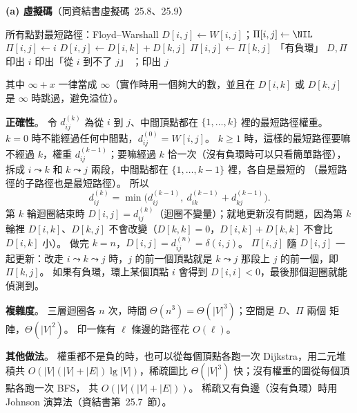 \begin{pastsoln}
\textbf{(a) 虛擬碼}（同資結書虛擬碼~25.8、25.9）
\begin{pseudo}{所有點對最短路徑：Floyd--Warshall}
            \State $D[i, j] \gets W[i, j]$；$\Pi[i, j] \gets \NIL$
                \State $\Pi[i, j] \gets i$
            \EndIf
        \EndFor
    \EndFor
     
                    \State $D[i, j] \gets D[i, k] + D[k, j]$
                    \State $\Pi[i, j] \gets \Pi[k, j]$
                \EndIf
            \EndFor
        \EndFor
    \EndFor
            \State \Return 「有負環」
        \EndIf
    \EndFor
    \State \Return $D, \Pi$
\EndFunction
\Statex
{}
        \State 印出 $i$
    \ElsIf{$\Pi[i, j] = \NIL$}
        \State 印出「從 $i$ 到不了 $j$」
    \Else
        \State {}；印出 $j$
    \EndIf
\EndProcedure
\end{pseudo}
其中 $\infty + x$ 一律當成 $\infty$（實作時用一個夠大的數，並且在 $D[i, k]$ 或 $D[k, j]$ 是
$\infty$ 時跳過，避免溢位）。

\textbf{正確性}。 令 $d_{ij}^{(k)}$ 為從 $i$ 到 $j$、中間頂點都在 $\{1, \ldots, k\}$ 裡的最短路徑權重。
$k = 0$ 時不能經過任何中間點，$d_{ij}^{(0)} = W[i, j]$。 $k \ge 1$ 時，這樣的最短路徑要嘛不經過
$k$，權重 $d_{ij}^{(k-1)}$；要嘛經過 $k$ 恰一次（沒有負環時可以只看簡單路徑），拆成
$i \leadsto k$ 和 $k \leadsto j$ 兩段，中間點都在 $\{1, \ldots, k-1\}$ 裡，各自是最短的
（最短路徑的子路徑也是最短路徑）。 所以
\[
d_{ij}^{(k)} = \min\bigl(d_{ij}^{(k-1)},\ d_{ik}^{(k-1)} + d_{kj}^{(k-1)}\bigr).
\]
第 $k$ 輪迴圈結束時 $D[i, j] = d_{ij}^{(k)}$（迴圈不變量）；就地更新沒有問題，因為第 $k$ 輪裡
$D[i, k]$、$D[k, j]$ 不會改變（$D[k, k] = 0$，$D[i, k] + D[k, k]$ 不會比 $D[i, k]$ 小）。
做完 $k = n$，$D[i, j] = d_{ij}^{(n)} = \delta(i, j)$。 $\Pi[i, j]$ 隨 $D[i, j]$ 一起更新：改走
$i \leadsto k \leadsto j$ 時，$j$ 的前一個頂點就是 $k \leadsto j$ 那段上 $j$ 的前一個，即
$\Pi[k, j]$。 如果有負環，環上某個頂點 $i$ 會得到 $D[i, i] < 0$，最後那個迴圈就能偵測到。

\textbf{複雜度}。 三層迴圈各 $n$ 次，時間 $\Theta(n^3) = \Theta(|V|^3)$；空間是 $D$、$\Pi$ 兩個
矩陣，$\Theta(|V|^2)$。  印一條有 $\ell$ 條邊的路徑花 $O(\ell)$。

\textbf{其他做法}。 權重都不是負的時，也可以從每個頂點各跑一次 Dijkstra，用二元堆積共
$O(|V|(|V| + |E|)\lg|V|)$，稀疏圖比 $\Theta(|V|^3)$ 快；沒有權重的圖從每個頂點各跑一次 BFS，
共 $O(|V|(|V| + |E|))$。 稀疏又有負邊（沒有負環）時用 Johnson 演算法（資結書第~25.7~節）。
\end{pastsoln}
